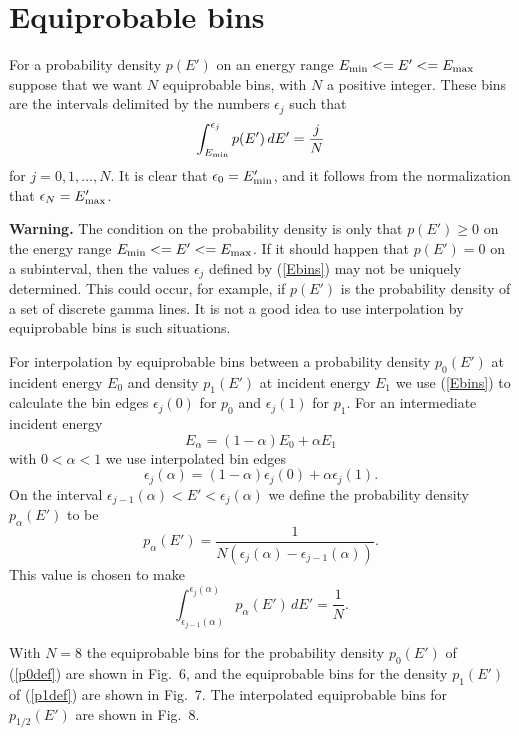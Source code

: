 \documentclass[11pt]{article}
\begin{document}
\begin{figure}

\end{figure}

\section{Equiprobable bins}
For a probability density
$p(E')$ on an energy range $E_{\rm min} <= E' <= E_{\rm max}$
suppose that we want $N$ equiprobable bins, with $N$ a positive
integer.
These bins are the intervals delimited by the numbers $\epsilon_j$
such that
\begin{equation}
  \int_{E_{\rm min}}^{\epsilon_j}
    p(E') \, dE' = \frac{j}{N}
  \label{Ebins}
\end{equation}
for $j = 0, 1, \ldots, N$.  It is clear that $\epsilon_0 = E'_{\rm min}$,
and it follows from the normalization that $\epsilon_N = E'_{\rm max}$.

{\bf Warning.}  The condition on the probability density is only
that $p(E') \ge 0$ on the energy range $E_{\rm min} <= E' <= E_{\rm max}$.
If it should happen that $p(E') = 0$ on a subinterval, then the
values $\epsilon_j$ defined by (\ref{Ebins}) may not be uniquely
determined.  This could occur, for example, if $p(E')$ is the probability
density of a set of discrete gamma lines.  It is not a good idea to use
interpolation by equiprobable bins is such situations.

For interpolation by equiprobable bins between a probability
density $p_0(E')$ at incident energy $E_0$ and density
$p_1(E')$ at incident energy $E_1$ we use (\ref{Ebins})
to calculate the bin edges $\epsilon_j(0)$ for $p_0$ and
$\epsilon_j(1)$ for $p_1$.  For an intermediate incident
energy
\[
  E_\alpha = (1 - \alpha) E_0 + \alpha E_1
\]
with $0 < \alpha < 1$ we use interpolated bin edges
\[
  \epsilon_j(\alpha) = (1 - \alpha) \epsilon_j(0) +
     \alpha \epsilon_j(1).
\]
On the interval $\epsilon_{j-1}(\alpha) < E' < \epsilon_j(\alpha)$
we define the probability density $p_\alpha(E')$ to be
\[
  p_\alpha(E') = \frac{1}{N( \epsilon_j(\alpha) - \epsilon_{j-1}(\alpha) ) }.
\]
This value is chosen to make
\[
  \int_{\epsilon_{j-1}(\alpha)}^{\epsilon_j(\alpha)} p_\alpha(E') \, dE' =
    \frac{1}{N}.
\]

With $N = 8$ the equiprobable bins for the probability density
$p_0(E')$ of (\ref{p0def}) are shown in Fig.~6, and the equiprobable
bins for the density $p_1(E')$ of (\ref{p1def}) are shown in Fig.~7.
The interpolated equiprobable bins for $p_{1/2}(E')$ are shown in 
Fig.~8.
\end{document}
